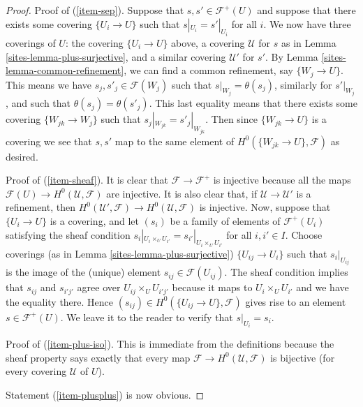 \begin{proof}

Proof of (\ref{item-sep}).
Suppose that $s, s' \in \mathcal{F}^+(U)$ and suppose that
there exists some covering $\{U_i \to U\}$ such that
$s|_{U_i} = s'|_{U_i}$ for all $i$. We now have three coverings
of $U$: the covering $\{U_i \to U\}$ above, a covering $\mathcal{U}$
for $s$ as in Lemma \ref{sites-lemma-plus-surjective},
and a similar covering $\mathcal{U}'$ for $s'$. By Lemma
\ref{sites-lemma-common-refinement}, we can find a common refinement,
say $\{W_j \to U\}$. This means we have $s_j, s'_j \in \mathcal{F}(W_j)$
such that $s|_{W_j} = \theta(s_j)$, similarly for $s'|_{W_j}$, and
such that $\theta(s_j) = \theta(s'_j)$. This last equality means
that there exists some covering $\{W_{jk} \to W_j\}$ such that
$s_j|_{W_{jk}} = s'_j|_{W_{jk}}$. Then since $\{W_{jk} \to U\}$
is a covering we see that $s, s'$ map to the same element of
$H^0(\{W_{jk} \to U\}, \mathcal{F})$ as desired.

\medskip\noindent
Proof of (\ref{item-sheaf}). It is clear that $\mathcal{F} \to
\mathcal{F}^+$ is injective because all the maps
$\mathcal{F}(U) \to H^0(\mathcal{U}, \mathcal{F})$
are injective. It is also clear that, if $\mathcal{U} \to
\mathcal{U}'$ is a refinement, then $H^0(\mathcal{U}', \mathcal{F})
\to H^0(\mathcal{U}, \mathcal{F})$ is injective. Now,
suppose that $\{U_i \to U\}$ is a covering, and let
$(s_i)$ be a family of elements of $\mathcal{F}^+(U_i)$
satisfying the sheaf condition
$s_i|_{U_i \times_U U_{i'}} = s_{i'}|_{U_i \times_U U_{i'}}$
for all $i, i' \in I$. Choose coverings (as in
Lemma \ref{sites-lemma-plus-surjective}) $\{U_{ij} \to U_i\}$
such that $s_i|_{U_{ij}}$ is the image of the (unique)
element $s_{ij} \in \mathcal{F}(U_{ij})$. The sheaf condition
implies that $s_{ij}$ and $s_{i'j'}$ agree over
$U_{ij} \times_U U_{i'j'}$ because it maps to
$U_i \times_U U_{i'}$ and we have the equality there.
Hence $(s_{ij}) \in H^0(\{U_{ij} \to U\}, \mathcal{F})$
gives rise to an element $s \in \mathcal{F}^+(U)$. We leave
it to the reader to verify that $s|_{U_i} = s_i$.

\medskip\noindent
Proof of (\ref{item-plus-iso}). This is immediate from the definitions
because the sheaf property says exactly that every map
$\mathcal{F} \to H^0(\mathcal{U}, \mathcal{F})$ is bijective
(for every covering $\mathcal{U}$ of $U$).

\medskip\noindent
Statement (\ref{item-plusplus}) is now obvious.
\end{proof}

